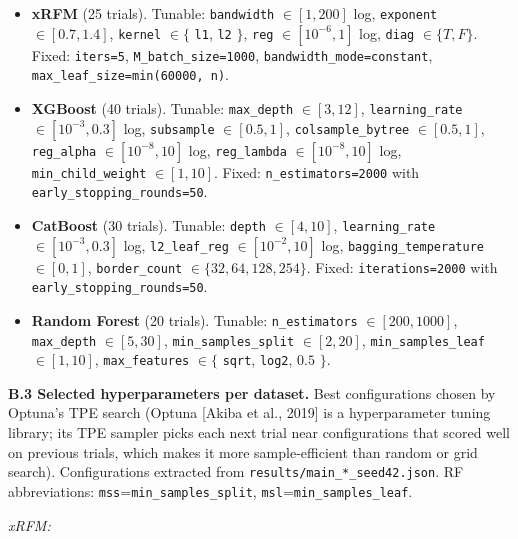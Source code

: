 \documentclass[
  11pt,
  onecolumn]{article}
\providecommand{\tightlist}{%
  \setlength{\itemsep}{0pt}\setlength{\parskip}{0pt}}
\begin{document}
\begin{itemize}
\tightlist
\item
  \textbf{xRFM} (25 trials). Tunable: \texttt{bandwidth} \(\in [1, 200]\)
  log, \texttt{exponent} \(\in [0.7, 1.4]\), \texttt{kernel} \(\in \{\)
  \texttt{l1}, \texttt{l2} \(\}\), \texttt{reg} \(\in [10^{-6}, 1]\) log,
  \texttt{diag} \(\in \{T, F\}\). Fixed: \texttt{iters=5},
  \texttt{M\_batch\_size=1000}, \texttt{bandwidth\_mode=constant},
  \texttt{max\_leaf\_size=min(60000, n)}.
\item
  \textbf{XGBoost} (40 trials). Tunable: \texttt{max\_depth}
  \(\in [3, 12]\), \texttt{learning\_rate} \(\in [10^{-3}, 0.3]\) log,
  \texttt{subsample} \(\in [0.5, 1]\), \texttt{colsample\_bytree}
  \(\in [0.5, 1]\), \texttt{reg\_alpha} \(\in [10^{-8}, 10]\) log,
  \texttt{reg\_lambda} \(\in [10^{-8}, 10]\) log,
  \texttt{min\_child\_weight} \(\in [1, 10]\). Fixed:
  \texttt{n\_estimators=2000} with \texttt{early\_stopping\_rounds=50}.
\item
  \textbf{CatBoost} (30 trials). Tunable: \texttt{depth} \(\in [4, 10]\),
  \texttt{learning\_rate} \(\in [10^{-3}, 0.3]\) log,
  \texttt{l2\_leaf\_reg} \(\in [10^{-2}, 10]\) log,
  \texttt{bagging\_temperature} \(\in [0, 1]\), \texttt{border\_count}
  \(\in \{32, 64, 128, 254\}\). Fixed: \texttt{iterations=2000} with
  \texttt{early\_stopping\_rounds=50}.
\item
  \textbf{Random Forest} (20 trials). Tunable: \texttt{n\_estimators}
  \(\in [200, 1000]\), \texttt{max\_depth} \(\in [5, 30]\),
  \texttt{min\_samples\_split} \(\in [2, 20]\),
  \texttt{min\_samples\_leaf} \(\in [1, 10]\), \texttt{max\_features}
  \(\in \{\) \texttt{sqrt}, \texttt{log2}, \(0.5\) \(\}\).
\end{itemize}

\textbf{B.3 Selected hyperparameters per dataset.} Best configurations
chosen by Optuna's TPE search (Optuna {[}Akiba et al., 2019{]} is a
hyperparameter tuning library; its TPE sampler picks each next trial
near configurations that scored well on previous trials, which makes
it more sample-efficient than random or grid search). Configurations
extracted from \texttt{results/main\_*\_seed42.json}. RF abbreviations:
\texttt{mss}=\texttt{min\_samples\_split},
\texttt{msl}=\texttt{min\_samples\_leaf}.

\emph{xRFM:}
\end{document}
